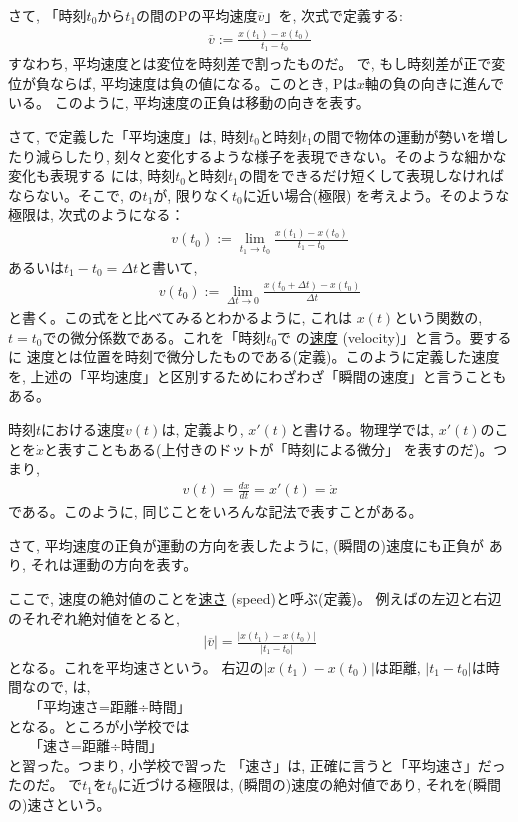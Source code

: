 さて, 「時刻$t_0$から$t_1$の間のPの平均速度$\overline{v}$」を, 次式で定義する:
\begin{eqnarray}\overline{v} :=\frac{x(t_1)-x(t_0)}{t_1-t_0}\label{eq:veloc_mean_def}\end{eqnarray}
すなわち, 平均速度とは変位を時刻差で割ったものだ。
で, もし時刻差が正で変位が負ならば, 
平均速度は負の値になる。このとき, Pは$x$軸の負の向きに進んでいる。
このように, 平均速度の正負は移動の向きを表す。

さて, で定義した「平均速度」は, 
時刻$t_0$と時刻$t_1$の間で物体の運動が勢いを増したり減らしたり, 
刻々と変化するような様子を表現できない。そのような細かな変化も表現する
には, 時刻$t_0$と時刻$t_1$の間をできるだけ短くして表現しなければならない。そこで, 
の$t_1$が, 限りなく$t_0$に近い場合(極限)
を考えよう。そのような極限は, 次式のようになる：
\begin{eqnarray}v(t_0):=\lim_{t_1\rightarrow t_0}\frac{x(t_1)-x(t_0)}{t_1-t_0}\label{eq:veloc_def0}\end{eqnarray}
あるいは$t_1-t_0=\Delta t$と書いて, 
\begin{eqnarray}v(t_0):=\lim_{\Delta t\rightarrow 0}\frac{x(t_0+\Delta t)-x(t_0)}{\Delta t}\label{eq:veloc_def1}\end{eqnarray}
と書く。この式をと比べてみるとわかるように, これは
$x(t)$という関数の, $t=t_0$での微分係数である。これを「時刻$t_0$で
の\underline{速度} (velocity)」と言う。要するに
速度とは位置を時刻で微分したものである(定義)。このように定義した速度を, 
上述の「平均速度」と区別するためにわざわざ「瞬間の速度」と言うこともある。

時刻$t$における速度$v(t)$は, 定義より, $x'(t)$と書ける。物理学では, 
$x'(t)$のことを$\dot{x}$と表すこともある(上付きのドットが「時刻による微分」
を表すのだ)。つまり,
\begin{eqnarray}v(t)=\frac{dx}{dt}=x'(t)=\dot{x}\label{eq:veloc_def2}\end{eqnarray}
である。このように, 同じことをいろんな記法で表すことがある。

さて, 平均速度の正負が運動の方向を表したように, (瞬間の)速度にも正負が
あり, それは運動の方向を表す。

ここで, 速度の絶対値のことを\underline{速さ} (speed)と呼ぶ(定義)。
例えばの左辺と右辺のそれぞれ絶対値をとると, 
\begin{eqnarray}|\overline{v}|=\frac{|x(t_1)-x(t_0)|}{|t_1-t_0|}\label{eq:veloc_mean_def_abs}\end{eqnarray}
となる。これを平均速さという。
右辺の$|x(t_1)-x(t_0)|$は距離, $|t_1-t_0|$は時間なので, 
は, \\
　　「平均速さ=距離÷時間」\\
となる。ところが小学校では\\
　　「速さ=距離÷時間」\\
と習った。つまり, 小学校で習った
「速さ」は, 正確に言うと「平均速さ」だったのだ。 
で$t_1$を$t_0$に近づける極限は, 
(瞬間の)速度の絶対値であり, それを(瞬間の)速さという。

